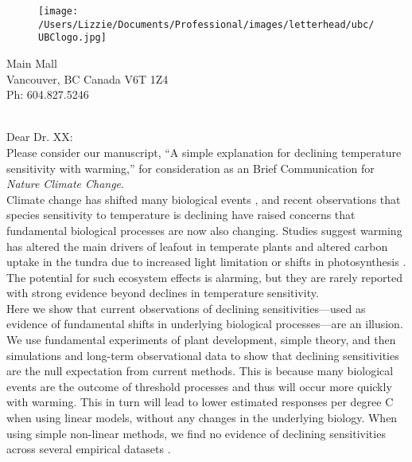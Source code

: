 \documentclass[11pt,a4paper]{article}
\begin{document}

\begin{figure}[htbp]
\hspace*{14cm}                                                           
\texttt{[image: /Users/Lizzie/Documents/Professional/images/letterhead/ubc/UBClogo.jpg]}
\end{figure}
\vspace{-10ex}
\begin{small}
 Main Mall \\
\noindent Vancouver, BC Canada V6T 1Z4\\
\noindent Ph: 604.827.5246\\
\end{small}
\vspace{2ex}\\
\noindent Dear Dr. XX:
\vspace{1.5ex}\\
Please consider our manuscript, ``A simple explanation for declining temperature sensitivity with warming,'' for consideration as an Brief Communication for \emph{Nature Climate Change}. 
\vspace{1.5ex}\\
Climate change has shifted many biological events \citep{IPCC:2014sm}, and recent observations that species sensitivity to temperature is declining have raised concerns that fundamental biological processes are now also changing. Studies suggest warming has altered the main drivers of leafout in temperate plants \citep{fu2015,gusewell2017,Samplonius:2018aa} and altered carbon uptake in the tundra due to increased light limitation or shifts in photosynthesis \citep{piao2017,Zhu2019}. The potential for such ecosystem effects is alarming, but they are rarely reported with strong evidence beyond declines in temperature sensitivity.
\vspace{1.5ex}\\
Here we show that current observations of declining sensitivities---used as evidence of fundamental shifts in underlying biological processes---are an illusion. We use fundamental experiments of plant development, simple theory, and then simulations and long-term observational data to show that declining sensitivities are the null expectation from current methods. This is because many biological events are the outcome of threshold processes and thus will occur more quickly with warming. This in turn will lead to lower estimated responses per degree C when using linear models, without any changes in the underlying biology. When using simple non-linear methods, we find no evidence of declining sensitivities across several empirical datasets \citep[including using the same dataset used in][]{fu2015} . %
\end{document}

